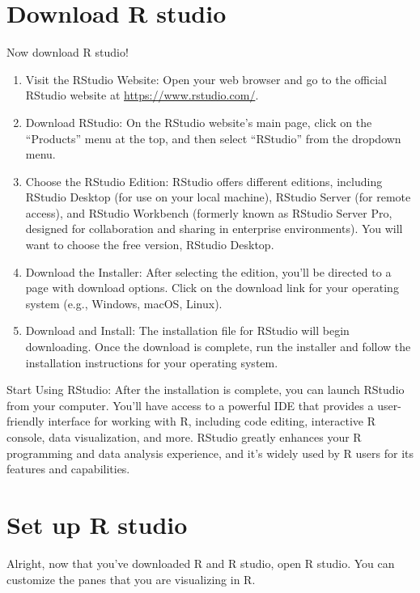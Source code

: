 \documentclass[
]{book}
\begin{document}
\hypertarget{download-r-studio}{%
\section{Download R studio}\label{download-r-studio}}

Now download R studio!

\begin{enumerate}
\def\labelenumi{\arabic{enumi}.}
\item
  Visit the RStudio Website: Open your web browser and go to the official RStudio website at \url{https://www.rstudio.com/}.
\item
  Download RStudio: On the RStudio website's main page, click on the ``Products'' menu at the top, and then select ``RStudio'' from the dropdown menu.
\item
  Choose the RStudio Edition: RStudio offers different editions, including RStudio Desktop (for use on your local machine), RStudio Server (for remote access), and RStudio Workbench (formerly known as RStudio Server Pro, designed for collaboration and sharing in enterprise environments). You will want to choose the free version, RStudio Desktop.
\item
  Download the Installer: After selecting the edition, you'll be directed to a page with download options. Click on the download link for your operating system (e.g., Windows, macOS, Linux).
\item
  Download and Install: The installation file for RStudio will begin downloading. Once the download is complete, run the installer and follow the installation instructions for your operating system.
\end{enumerate}

Start Using RStudio: After the installation is complete, you can launch RStudio from your computer. You'll have access to a powerful IDE that provides a user-friendly interface for working with R, including code editing, interactive R console, data visualization, and more. RStudio greatly enhances your R programming and data analysis experience, and it's widely used by R users for its features and capabilities.

\hypertarget{set-up-r-studio}{%
\section{Set up R studio}\label{set-up-r-studio}}

Alright, now that you've downloaded R and R studio, open R studio. You can customize the panes that you are visualizing in R.
\end{document}

